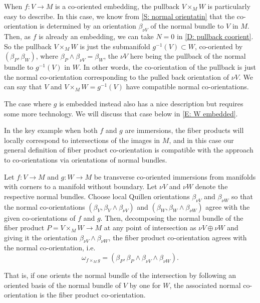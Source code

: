 \begin{example}\label{E: V embedded}
	When $f:V\to M$ is a co-oriented embedding, the pullback $V\times_MW$ is particularly easy to describe.
	In this case, we know from \cref{S: normal orientatin} that the co-orientation is determined by an orientation $\beta_{\nu V}$ of the normal bundle to $V$ in $M$.
	Then, as $f$ is already an embedding, we can take $N=0$ in \cref{D: pullback coorient}.
	So the pullback $V\times_MW$ is just the submanifold $g^{-1}(V)\subset W$, co-oriented by $(\beta_P,\beta_W)$, where $\beta_P\wedge \beta_{\nu V}=\beta_W$, the $\nu V$ here being the pullback of the normal bundle to $g^{-1}(V)$ in $W$.
	In other words, the co-orientation of the pullback is just the normal co-orientation corresponding to the pulled back orientation of $\nu V$.
	We can say that $V$ and $V\times_MW =g^{-1}(V)$ have compatible normal co-orientations.

	The case where $g$ is embedded instead also has a nice description but requires some more technology.
	We will discuss that case below in \cref{E: W embedded}.
\end{example}

In the key example when both $f$ and $g$ are immersions, the fiber products will locally correspond to intersections of the images in $M$, and in this case our general definition of fiber product co-orientation is compatible with the approach to co-orientations via orientations of normal bundles.

\begin{proposition}\label{P: normal pullback}
	Let $f : V \to M$ and $g: W \to M$ be transverse co-oriented immersions from manifolds with corners to a manifold without boundary.
	Let $\nu V$ and $\nu W$ denote the respective normal bundles.
	Choose local Quillen orientations $\beta_{\nu V}$ and $\beta_{\nu W}$ so that the normal co-orientations $(\beta_V,\beta_V\wedge \beta_{\nu V})$ and $(\beta_W,\beta_W\wedge \beta_{\nu W})$ agree with the given co-orientations of $f$ and $g$.
	Then, decomposing the normal bundle of the fiber product $P=V\times_M W\to M$ at any point of intersection as $\nu V \oplus \nu W$ and giving it the orientation $\beta_{\nu V}\wedge \beta_{\nu W}$, the fiber product co-orientation agrees with the normal co-orientation, i.e.\
	$$\omega_{f\times_M g}=(\beta_P,\beta_P\wedge \beta_{\nu V}\wedge \beta_{\nu W}).$$
\end{proposition}

That is, if one orients the normal bundle of the intersection by following an oriented basis of the normal bundle of $V$ by one for $W$,
the associated normal co-orientation is the fiber product co-orientation.

